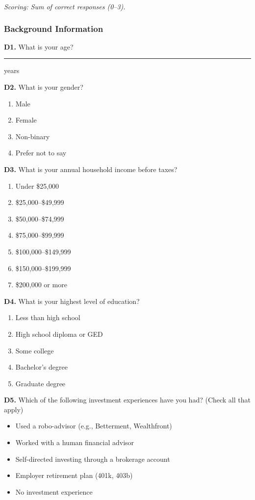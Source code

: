 \noindent\textit{Scoring: Sum of correct responses (0--3).}

\subsubsection{Background Information}

\noindent\textbf{D1.} What is your age? \rule{1cm}{0.4pt} years

\medskip
\noindent\textbf{D2.} What is your gender?

\begin{enumerate}[label=\arabic*.]
  \item Male
  \item Female
  \item Non-binary
  \item Prefer not to say
\end{enumerate}

\noindent\textbf{D3.} What is your annual household income before taxes?

\begin{enumerate}[label=\arabic*.]
  \item Under \$25,000
  \item \$25,000--\$49,999
  \item \$50,000--\$74,999
  \item \$75,000--\$99,999
  \item \$100,000--\$149,999
  \item \$150,000--\$199,999
  \item \$200,000 or more
\end{enumerate}

\noindent\textbf{D4.} What is your highest level of education?

\begin{enumerate}[label=\arabic*.]
  \item Less than high school
  \item High school diploma or GED
  \item Some college
  \item Bachelor's degree
  \item Graduate degree
\end{enumerate}

\noindent\textbf{D5.} Which of the following investment experiences have you had? (Check all that apply)

\begin{itemize}[label=$\square$]
  \item Used a robo-advisor (e.g., Betterment, Wealthfront)
  \item Worked with a human financial advisor
  \item Self-directed investing through a brokerage account
  \item Employer retirement plan (401k, 403b)
  \item No investment experience
\end{itemize}

